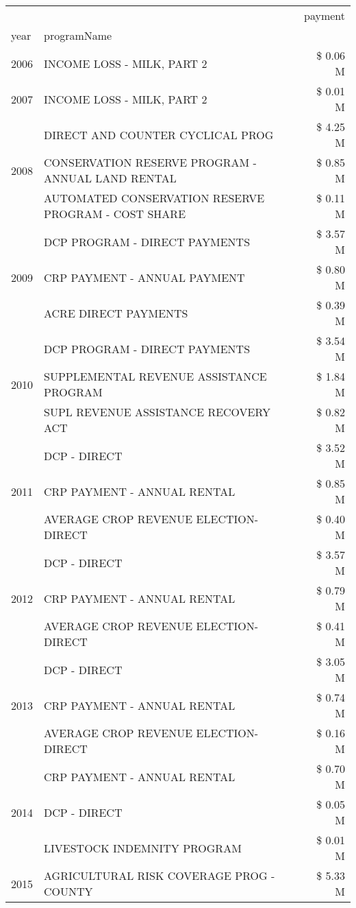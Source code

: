 \begin{tabular}{llr}
\toprule
 &  & payment \\
year & programName &  \\
\midrule
2006 & INCOME LOSS - MILK, PART 2 & \$ 0.06 M \\
\cline{1-3}
2007 & INCOME LOSS - MILK, PART 2 & \$ 0.01 M \\
\cline{1-3}
\multirow[t]{3}{*}{2008} & DIRECT AND COUNTER CYCLICAL PROG & \$ 4.25 M \\
 & CONSERVATION RESERVE PROGRAM - ANNUAL LAND RENTAL & \$ 0.85 M \\
 & AUTOMATED CONSERVATION RESERVE PROGRAM - COST SHARE & \$ 0.11 M \\
\cline{1-3}
\multirow[t]{3}{*}{2009} & DCP PROGRAM - DIRECT PAYMENTS & \$ 3.57 M \\
 & CRP PAYMENT - ANNUAL PAYMENT & \$ 0.80 M \\
 & ACRE DIRECT PAYMENTS & \$ 0.39 M \\
\cline{1-3}
\multirow[t]{3}{*}{2010} & DCP PROGRAM - DIRECT PAYMENTS & \$ 3.54 M \\
 & SUPPLEMENTAL REVENUE ASSISTANCE PROGRAM & \$ 1.84 M \\
 & SUPL REVENUE ASSISTANCE RECOVERY ACT & \$ 0.82 M \\
\cline{1-3}
\multirow[t]{3}{*}{2011} & DCP - DIRECT & \$ 3.52 M \\
 & CRP PAYMENT - ANNUAL RENTAL & \$ 0.85 M \\
 & AVERAGE CROP REVENUE ELECTION-DIRECT & \$ 0.40 M \\
\cline{1-3}
\multirow[t]{3}{*}{2012} & DCP - DIRECT & \$ 3.57 M \\
 & CRP PAYMENT - ANNUAL RENTAL & \$ 0.79 M \\
 & AVERAGE CROP REVENUE ELECTION-DIRECT & \$ 0.41 M \\
\cline{1-3}
\multirow[t]{3}{*}{2013} & DCP - DIRECT & \$ 3.05 M \\
 & CRP PAYMENT - ANNUAL RENTAL & \$ 0.74 M \\
 & AVERAGE CROP REVENUE ELECTION-DIRECT & \$ 0.16 M \\
\cline{1-3}
\multirow[t]{3}{*}{2014} & CRP PAYMENT - ANNUAL RENTAL & \$ 0.70 M \\
 & DCP - DIRECT & \$ 0.05 M \\
 & LIVESTOCK INDEMNITY PROGRAM & \$ 0.01 M \\
\cline{1-3}
\multirow[t]{3}{*}{2015} & AGRICULTURAL RISK COVERAGE PROG - COUNTY & \$ 5.33 M \\

\end{tabular}

